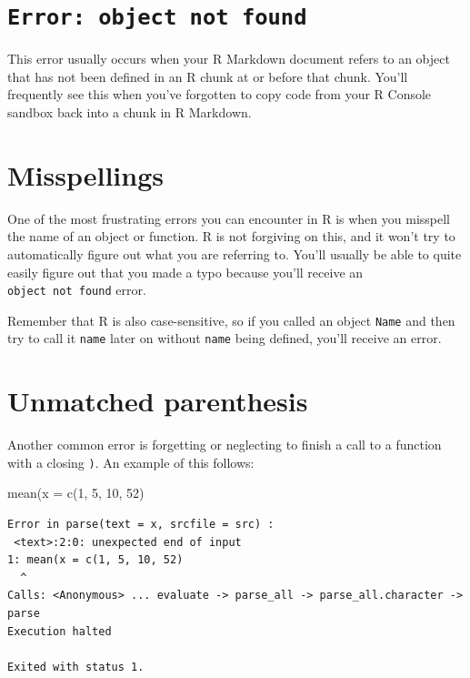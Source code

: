 \documentclass[]{tufte-book}
\newenvironment{Shaded}{\begin{snugshade}}{\end{snugshade}}
\newcommand{\AttributeTok}[1]{\textcolor[rgb]{0.77,0.63,0.00}{#1}}
\newcommand{\DecValTok}[1]{\textcolor[rgb]{0.00,0.00,0.81}{#1}}
\newcommand{\FunctionTok}[1]{\textcolor[rgb]{0.00,0.00,0.00}{#1}}
\newcommand{\NormalTok}[1]{#1}
\begin{document}
\hypertarget{error-object-not-found}{%
\section{\texorpdfstring{\texttt{Error:\ object\ not\ found}}{Error: object not found}}\label{error-object-not-found}}

This error usually occurs when your R Markdown document refers to an object that has not been defined in an R chunk at or before that chunk. You'll frequently see this when you've forgotten to copy code from your R Console sandbox back into a chunk in R Markdown.

\hypertarget{misspellings}{%
\section{Misspellings}\label{misspellings}}

One of the most frustrating errors you can encounter in R is when you misspell the name of an object or function. R is not forgiving on this, and it won't try to automatically figure out what you are referring to. You'll usually be able to quite easily figure out that you made a typo because you'll receive an \texttt{object\ not\ found} error.

Remember that R is also case-sensitive, so if you called an object \texttt{Name} and then try to call it \texttt{name} later on without \texttt{name} being defined, you'll receive an error.

\hypertarget{unmatched-parenthesis}{%
\section{Unmatched parenthesis}\label{unmatched-parenthesis}}

Another common error is forgetting or neglecting to finish a call to a function with a closing \texttt{)}. An example of this follows:

\begin{Shaded}
\begin{Highlighting}[]
\FunctionTok{mean}\NormalTok{(}\AttributeTok{x =} \FunctionTok{c}\NormalTok{(}\DecValTok{1}\NormalTok{, }\DecValTok{5}\NormalTok{, }\DecValTok{10}\NormalTok{, }\DecValTok{52}\NormalTok{)}
\end{Highlighting}
\end{Shaded}

\begin{verbatim}
Error in parse(text = x, srcfile = src) :
 <text>:2:0: unexpected end of input
1: mean(x = c(1, 5, 10, 52)
  ^
Calls: <Anonymous> ... evaluate -> parse_all -> parse_all.character -> parse
Execution halted

Exited with status 1.
\end{verbatim}
\end{document}
